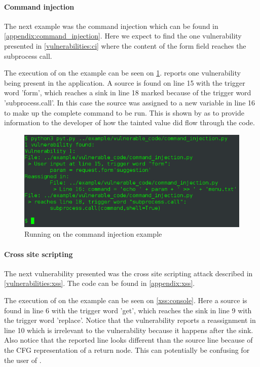 \paragraph{Command injection}
The next example was the command injection which can be found in \cref{appendix:command_injection}.
Here we expect to find the one vulnerability presented in \cref{vulnerabilities:ci} where the content of the form field reaches the subprocess call.

The execution of \pyt{} on the example can be seen on \cref{ci:console}.
\pyt{} reports one vulnerability being present in the application.
A source is found on line 15 with the trigger word 'form', which reaches a sink in line 18 marked because of the trigger word 'subprocess.call'.
In this case the source was assigned to a new variable in line 16 to make up the complete command to be run.
This is shown by \pyt{} as to provide information to the developer of how the tainted value did flow through the code.
  
\begin{figure}
  \includegraphics[width=\textwidth]{./figures/command_injection_console.png}
  \caption{Running \pyt{} on the command injection example}
  \label{ci:console}
\end{figure}

\paragraph{Cross site scripting}
The next vulnerability presented was the cross site scripting attack described in \cref{vulnerabilities:xss}.
The code can be found in \cref{appendix:xss}.

The execution of \pyt{} on the example can be seen on \cref{xss:console}.
Here a source is found in line 6 with the trigger word 'get', which reaches the sink in line 9 with the trigger word 'replace'.
Notice that the vulnerability reports a reassignment in line 10 which is irrelevant to the vulnerability because it happens after the sink.
Also notice that the reported line looks different than the source line because of the CFG representation of a return node.
This can potentially be confusing for the user of \pyt{}.

